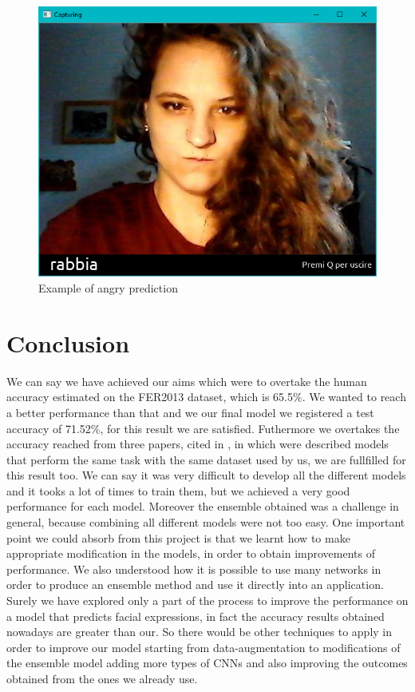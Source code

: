 \documentclass[10pt,twocolumn,letterpaper]{article}
\begin{document}
\begin{figure}[H]
   \centering
   \includegraphics[width=0.8\linewidth]{./immagini/ele_rabbia.png}
   \caption{Example of angry prediction}
\end{figure}

\section{Conclusion}
We can say we have achieved our aims which were to overtake the human accuracy estimated on the FER2013 dataset, which is 65.5\%. We wanted to reach a better performance than that and we our final model we registered a test accuracy of 71.52\%, for this result we are satisfied.
Futhermore we overtakes the accuracy reached from three papers, cited in \cite{paper}, in which were described models that perform the same task with the same dataset used by us, we are fullfilled for this result too. We can say it was very difficult to develop all the different models and it tooks a lot of times to train them, but we achieved a very good performance for each model. Moreover the ensemble obtained was a challenge in general, because combining all different models were not too easy. One important point we could absorb from this project is that we learnt how to make appropriate modification in the models, in order to obtain improvements of performance. We also understood how it is possible to use many networks in order to produce an ensemble method and use it directly into an application. Surely we have explored only a part of the process to improve the performance on a model that predicts facial expressions, in fact the accuracy results obtained nowadays are greater than our. So there would be other techniques to apply in order to improve our model starting from data-augmentation to modifications of the ensemble model adding more types of CNNs and also improving the outcomes obtained from the ones we already use.

{\small
   
   
}
\end{document}
